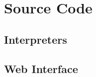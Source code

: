 \chapter{Source Code}

\section{Interpreters}
\label{app:interpreters}


\section{Web Interface}
\label{app:web}


